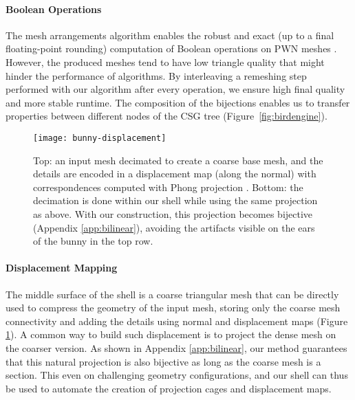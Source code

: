 \paragraph{Boolean Operations}
The mesh arrangements algorithm enables the robust and exact (up to a final floating-point rounding) computation of Boolean operations on PWN meshes \cite{zhou2016mesh}. 
However, the produced meshes tend to have low triangle quality that might hinder the performance of  algorithms. %
By interleaving a remeshing step performed with our algorithm after every operation, we ensure  high final quality and more stable runtime. The composition of the bijections enables us to transfer properties between different nodes of the CSG tree (Figure~\ref{fig:birdengine}).%


\begin{figure}
    \centering
    \texttt{[image: bunny-displacement]}
    \caption{Top: an input mesh decimated to create a coarse base mesh, and the details are encoded in a displacement map (along the normal) with correspondences computed with Phong projection \cite{kobbelt1998interactive}. Bottom: the decimation is done within our shell while using the same projection as above. With our construction, this projection becomes bijective (Appendix \ref{app:bilinear}), avoiding the artifacts visible on the ears of  the bunny in the top row.}
    \label{fig:displacement-mapping}
    
\end{figure}
\paragraph{Displacement Mapping}
The middle surface of the shell is a coarse triangular mesh that can be directly used to compress the geometry of the input mesh, storing only the coarse mesh connectivity and adding the details using normal and displacement maps (Figure \ref{fig:displacement-mapping}). A common way to build such displacement is to project  the dense mesh on the coarser version. As shown in Appendix \ref{app:bilinear}, our method guarantees that this natural projection is also bijective as long as the coarse mesh is a section. This 
even on challenging geometry configurations, and our shell can thus be used to automate the creation of projection cages and displacement maps.

